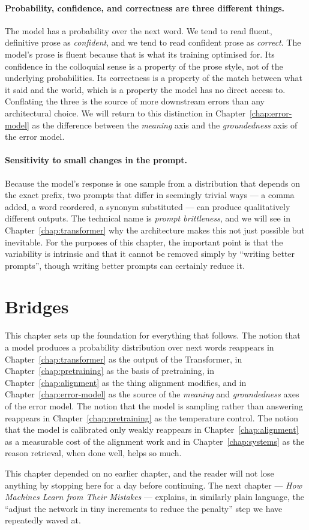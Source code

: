 \paragraph{Probability, confidence, and correctness are three
different things.} The model has a probability over the next
word. We tend to read fluent, definitive prose as
\emph{confident}, and we tend to read confident prose as
\emph{correct}. The model's prose is fluent because that is
what its training optimised for. Its confidence in the
colloquial sense is a property of the prose style, not of the
underlying probabilities. Its correctness is a property of the
match between what it said and the world, which is a property
the model has no direct access to. Conflating the three is the
source of more downstream errors than any architectural
choice. We will return to this distinction in Chapter~\ref{chap:error-model} as
the difference between the \emph{meaning} axis and the
\emph{groundedness} axis of the error model.

\paragraph{Sensitivity to small changes in the prompt.} Because
the model's response is one sample from a distribution that
depends on the exact prefix, two prompts that differ in
seemingly trivial ways --- a comma added, a word reordered, a
synonym substituted --- can produce qualitatively different
outputs. The technical name is \emph{prompt brittleness}, and
we will see in Chapter~\ref{chap:transformer} why the architecture makes this not
just possible but inevitable. For the purposes of this chapter,
the important point is that the variability is intrinsic and
that it cannot be removed simply by ``writing better prompts'',
though writing better prompts can certainly reduce it.

\section*{Bridges}

This chapter sets up the foundation for everything that follows.
The notion that a model produces a probability distribution over
next words reappears in Chapter~\ref{chap:transformer} as the output of the
Transformer, in Chapter~\ref{chap:pretraining} as the basis of pretraining, in
Chapter~\ref{chap:alignment} as the thing alignment modifies, and in Chapter~\ref{chap:error-model}
as the source of the \emph{meaning} and \emph{groundedness} axes
of the error model. The notion that the model is sampling
rather than answering reappears in Chapter~\ref{chap:pretraining} as the temperature
control. The notion that the model is calibrated only weakly
reappears in Chapter~\ref{chap:alignment} as a measurable cost of the alignment
work and in Chapter~\ref{chap:systems} as the reason retrieval, when done well,
helps so much.

This chapter depended on no earlier chapter, and the reader
will not lose anything by stopping here for a day before
continuing. The next chapter --- \emph{How Machines Learn from
Their Mistakes} --- explains, in similarly plain language, the
``adjust the network in tiny increments to reduce the
penalty'' step we have repeatedly waved at.
